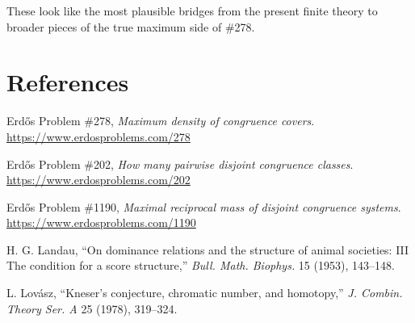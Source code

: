 \documentclass[11pt]{article}
\theoremstyle{definition}
\begin{document}
These look like the most plausible bridges from the present finite theory to broader pieces of the true maximum side of \#278.

\section*{References}
\begin{enumerate}[label={[{\arabic*}]}]
    \item Erd\H{o}s Problem \#278, \emph{Maximum density of congruence covers}. \url{https://www.erdosproblems.com/278}
    \item Erd\H{o}s Problem \#202, \emph{How many pairwise disjoint congruence classes}. \url{https://www.erdosproblems.com/202}
    \item Erd\H{o}s Problem \#1190, \emph{Maximal reciprocal mass of disjoint congruence systems}. \url{https://www.erdosproblems.com/1190}
    \item H. G. Landau, ``On dominance relations and the structure of animal societies: III The condition for a score structure,'' \emph{Bull. Math. Biophys.} 15 (1953), 143--148.
    \item L. Lov\'asz, ``Kneser's conjecture, chromatic number, and homotopy,'' \emph{J. Combin. Theory Ser. A} 25 (1978), 319--324.
\end{enumerate}
\end{document}
